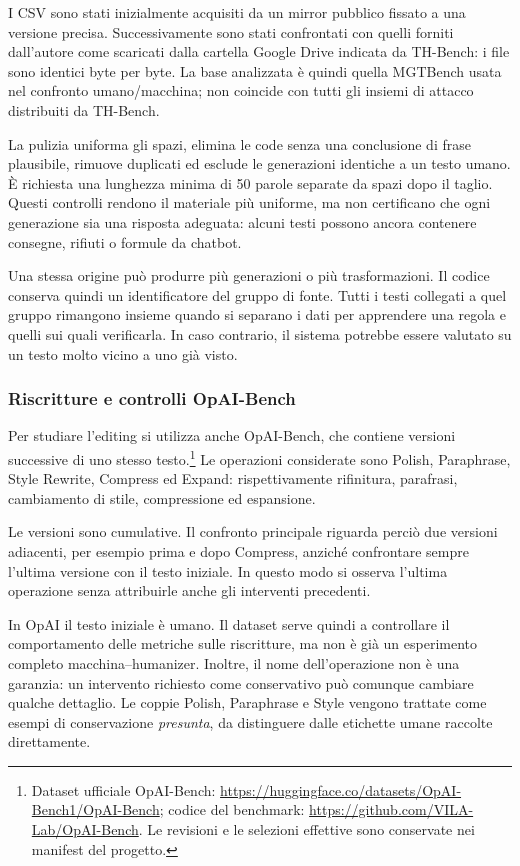 I CSV sono stati inizialmente acquisiti da un mirror pubblico fissato a una versione precisa. Successivamente sono stati confrontati con quelli forniti dall'autore come scaricati dalla cartella Google Drive indicata da TH-Bench: i file sono identici byte per byte. La base analizzata è quindi quella MGTBench usata nel confronto umano/macchina; non coincide con tutti gli insiemi di attacco distribuiti da TH-Bench.

La pulizia uniforma gli spazi, elimina le code senza una conclusione di frase plausibile, rimuove duplicati ed esclude le generazioni identiche a un testo umano. È richiesta una lunghezza minima di 50 parole separate da spazi dopo il taglio. Questi controlli rendono il materiale più uniforme, ma non certificano che ogni generazione sia una risposta adeguata: alcuni testi possono ancora contenere consegne, rifiuti o formule da chatbot.

Una stessa origine può produrre più generazioni o più trasformazioni. Il codice conserva quindi un identificatore del gruppo di fonte. Tutti i testi collegati a quel gruppo rimangono insieme quando si separano i dati per apprendere una regola e quelli sui quali verificarla. In caso contrario, il sistema potrebbe essere valutato su un testo molto vicino a uno già visto.

\subsubsection{Riscritture e controlli OpAI-Bench}\label{riscritture-e-controlli-opai-bench}

Per studiare l'editing si utilizza anche OpAI-Bench, che contiene versioni successive di uno stesso testo.\footnote{Dataset ufficiale OpAI-Bench: \url{https://huggingface.co/datasets/OpAI-Bench1/OpAI-Bench}; codice del benchmark: \url{https://github.com/VILA-Lab/OpAI-Bench}. Le revisioni e le selezioni effettive sono conservate nei manifest del progetto.} Le operazioni considerate sono Polish, Paraphrase, Style Rewrite, Compress ed Expand: rispettivamente rifinitura, parafrasi, cambiamento di stile, compressione ed espansione.

Le versioni sono cumulative. Il confronto principale riguarda perciò due versioni adiacenti, per esempio prima e dopo Compress, anziché confrontare sempre l'ultima versione con il testo iniziale. In questo modo si osserva l'ultima operazione senza attribuirle anche gli interventi precedenti.

In OpAI il testo iniziale è umano. Il dataset serve quindi a controllare il comportamento delle metriche sulle riscritture, ma non è già un esperimento completo macchina--humanizer. Inoltre, il nome dell'operazione non è una garanzia: un intervento richiesto come conservativo può comunque cambiare qualche dettaglio. Le coppie Polish, Paraphrase e Style vengono trattate come esempi di conservazione \emph{presunta}, da distinguere dalle etichette umane raccolte direttamente.

